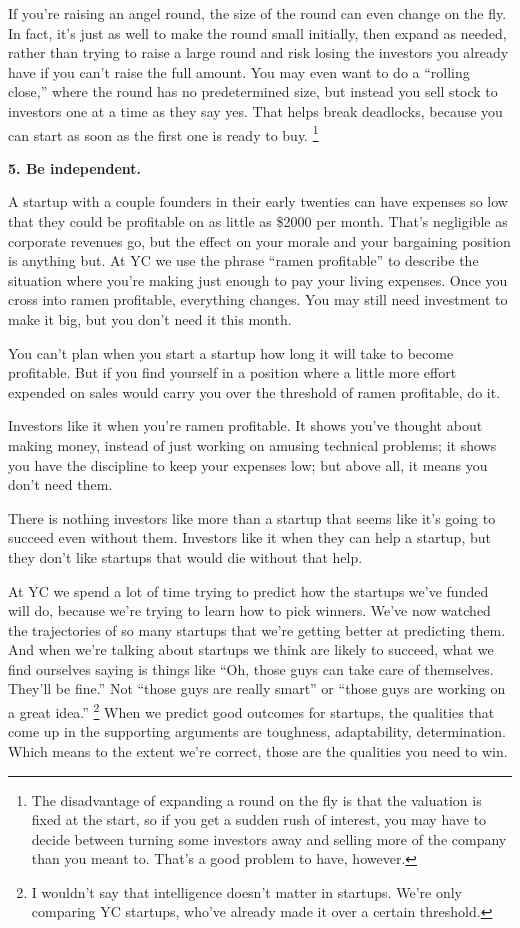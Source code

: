 If you're raising an angel round, the size of the round can even change
on the fly. In fact, it's just as well to make the round small
initially, then expand as needed, rather than trying to raise a large
round and risk losing the investors you already have if you can't raise
the full amount. You may even want to do a ``rolling close,'' where the
round has no predetermined size, but instead you sell stock to investors
one at a time as they say yes. That helps break deadlocks, because you
can start as soon as the first one is ready to buy.
\footnote{The disadvantage of expanding a round on the fly is that the
valuation is fixed at the start, so if you get a sudden rush of
interest, you may have to decide between turning some investors away and
selling more of the company than you meant to. That's a good problem to
have, however.}

\textbf{5. Be independent.}

A startup with a couple founders in their early twenties can have
expenses so low that they could be profitable on as little as \$2000 per
month. That's negligible as corporate revenues go, but the effect on
your morale and your bargaining position is anything but. At YC we use
the phrase ``ramen profitable'' to describe the situation where you're
making just enough to pay your living expenses. Once you cross into
ramen profitable, everything changes. You may still need investment to
make it big, but you don't need it this month.

You can't plan when you start a startup how long it will take to become
profitable. But if you find yourself in a position where a little more
effort expended on sales would carry you over the threshold of ramen
profitable, do it.

Investors like it when you're ramen profitable. It shows you've thought
about making money, instead of just working on amusing technical
problems; it shows you have the discipline to keep your expenses low;
but above all, it means you don't need them.

There is nothing investors like more than a startup that seems like it's
going to succeed even without them. Investors like it when they can help
a startup, but they don't like startups that would die without that
help.

At YC we spend a lot of time trying to predict how the startups we've
funded will do, because we're trying to learn how to pick winners. We've
now watched the trajectories of so many startups that we're getting
better at predicting them. And when we're talking about startups we
think are likely to succeed, what we find ourselves saying is things
like ``Oh, those guys can take care of themselves. They'll be fine.''
Not ``those guys are really smart'' or ``those guys are working on a
great idea.'' \footnote{I wouldn't say that intelligence doesn't matter in startups.
We're only comparing YC startups, who've already made it over a certain
threshold.} When we predict good outcomes for
startups, the qualities that come up in the supporting arguments are
toughness, adaptability, determination. Which means to the extent we're
correct, those are the qualities you need to win.

